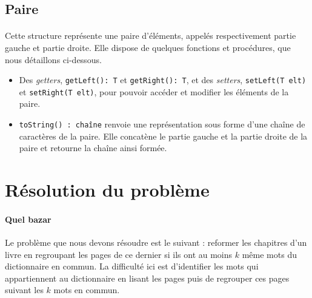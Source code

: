 \documentclass[a4paper]{article}
\begin{document}
		\subsection{Paire}
	    	\paragraph{}{
	    	Cette structure représente une paire d'éléments, appelés 
	    	respectivement partie gauche et partie droite. Elle dispose de quelques 
	    	fonctions et procédures, que nous détaillons ci-dessous.
	    	}
	    	
	    	\begin{itemize}
	    	
	    		\item Des \textit{getters}, \verb|getLeft(): T| et \verb|getRight(): T|, 
	    		et des \textit{setters}, \verb|setLeft(T elt)| et \verb|setRight(T elt)|, 
	    		pour pouvoir accéder et modifier les éléments de la paire.
	    		
	    		\item \verb|toString() : chaîne| renvoie une représentation sous forme 
	    		d'une chaîne de caractères de la paire. Elle concatène le partie gauche 
	    		et la partie droite de la paire et retourne la chaîne ainsi formée.
	    		
	    	\end{itemize}
		
		
	\section{Résolution du problème}
	
		\paragraph{Quel bazar}{
		Le problème que nous devons résoudre est le suivant : reformer les chapitres 
		d'un livre en regroupant les pages de ce dernier si ils ont au moins $k$ même
		mots du dictionnaire en commun. La difficulté ici est d'identifier les mots 
		qui appartiennent au dictionnaire en lisant les pages puis de regrouper ces
		pages suivant les $k$ mots en commun.
		}
		
\end{document}
